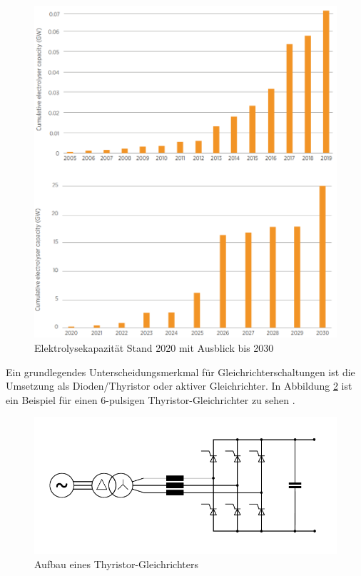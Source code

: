 	\begin{figure}
		\centering
		\includegraphics[width=0.7\linewidth]{content/Grafiken/Ely_Capacity}
		\caption[Elektrolyse Kapazität bis 2030]{Elektrolysekapazität Stand 2020 mit Ausblick bis 2030 \cite{IRENA2020}}
		\label{fig:elycapacity}
	\end{figure}
Ein grundlegendes Unterscheidungsmerkmal für Gleichrichterschaltungen ist die Umsetzung als Dioden/Thyristor oder aktiver Gleichrichter. In Abbildung \ref{fig:thyristor} ist ein Beispiel für einen 6-pulsigen Thyristor-Gleichrichter zu sehen . 
\begin{figure} 
	\centering
	\includegraphics[width=0.9\linewidth]{content/Grafiken/Thyristor}
	\caption{Aufbau eines Thyristor-Gleichrichters}
	\label{fig:thyristor}
\end{figure}
